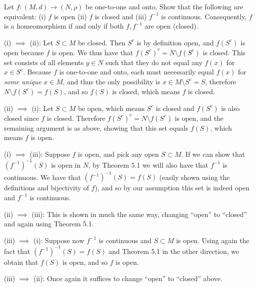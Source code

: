 \begin{exercise}{57}
    Let $f: (M, d) \rightarrow (N, \rho)$ be one-to-one and onto.
    Show that the following are equivalent: (i) $f$ is open (ii) $f$ is closed and (iii) $f^{-1}$ is continuous.
    Consequently, $f$ is a homeomorphism if and only if both $f, f^{-1}$ are open (closed).
\end{exercise}

\begin{solution}
    
    (i) $\implies$ (ii): Let $S \subset M$ be closed.
    Then $S^{c}$ is by definition open, and $f(S^{c})$ is open because $f$ is open.
    We thus have that $f(S^c)^c = N \setminus f(S^c)$ is closed.
    This set consists of all elements $y \in N$ such that they do not equal any $f(x)$ for $x \in S^c$.
    Because $f$ is one-to-one and onto, each must necessarily equal $f(x)$ for \textit{some unique} $x \in M$, and thus the only possibility is $x \in M \setminus S^{c} = S$, therefore $N \setminus f(S^c) = f(S)$, and so $f(S)$ is closed, which means $f$ is closed.

    (ii) $\implies$ (i): Let $S \subset M$ be open, which means $S^{c}$ is closed and $f(S^c)$ is also closed since $f$ is closed.
    Therefore $f(S^c)^c = N \setminus f(S^c)$ is open, and the remaining argument is as above, showing that this set equals $f(S)$, which means $f$ is open.

    (i) $\implies$ (iii): Suppose $f$ is open, and pick any open $S \subset M$.
    If we can show that $(f^{-1})^{-1}(S)$ is open in $N$, by Theorem 5.1 we will also have that $f^{-1}$ is continuous.
    We have that $(f^{-1})^{-1}(S) = f(S)$ (easily shown using the definitions and bijectivity of $f$), and so by our assumption this set is indeed open and $f^{-1}$ is continuous.
    
    (ii) $\implies$ (iii): This is shown in much the same way, changing ``open'' to ``closed'' and again using Theorem 5.1.

    (iii) $\implies$ (i): Suppose now $f^{-1}$ is continuous and $S \subset M$ is open.
    Using again the fact that $(f^{-1})^{-1}(S) = f(S)$ and Theorem 5.1 in the other direction, we obtain that $f(S)$ is open, and so $f$ is open.

    (iii) $\implies$ (ii): Once again it suffices to change ``open'' to ``closed'' above.
    
\end{solution}